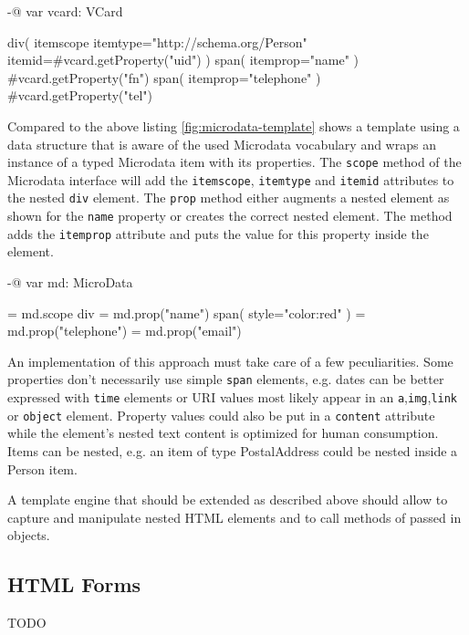 \documentclass[12pt,a4paper]{scrartcl}		%
\begin{document}
\begin{anylisting}[label=fig:naive-microdata-template,
                   caption={Defining all Microdata attributes manually in an HTML template}]
-@ var vcard: VCard

div( itemscope itemtype="http://schema.org/Person" 
     itemid=#{vcard.getProperty("uid")} )
  span( itemprop="name" )
    #{vcard.getProperty("fn")}
  span( itemprop="telephone" ) 
    #{vcard.getProperty("tel")}
\end{anylisting}

Compared to the above listing \ref{fig:microdata-template} shows a template
using a data structure that is aware of the used Microdata vocabulary and wraps
an instance of a typed Microdata item with its properties. The
\lstinline:scope: method of the Microdata interface will add the
\lstinline:itemscope:, \lstinline:itemtype: and \lstinline:itemid: attributes to
the nested \lstinline:div: element. The \lstinline:prop: method either augments
a nested element as shown for the \lstinline:name: property or creates the
correct nested element. The method adds the \lstinline:itemprop: attribute and
puts the value for this property inside the element.

\begin{anylisting}[label=fig:microdata-template,
                   caption={Using a Microdata-aware data structure in a template}]
-@ var md: MicroData

= md.scope
  div
    = md.prop("name")
      span( style="color:red" )
    = md.prop("telephone")
    = md.prop("email")
\end{anylisting}

An implementation of this approach must take care of a few
peculiarities.\cite{Hickson2011} Some properties don't necessarily use simple
\lstinline:span: elements, e.g. dates can be better expressed with
\lstinline:time: elements or URI values most likely appear in an
\lstinline:a:,\lstinline:img:,\lstinline:link: or \lstinline:object:
element. Property values could also be put in a \lstinline:content: attribute
while the element's nested text content is optimized for human
consumption. Items can be nested, e.g. an item of type PostalAddress could be
nested inside a Person item.

A template engine that should be extended as described above should allow to
capture and manipulate nested HTML elements and to call methods of passed in
objects.

\subsection{HTML Forms}
\label{sec:html-forms}
TODO
\end{document}
